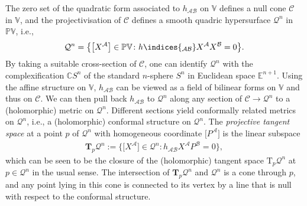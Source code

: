 \documentclass[10pt,a4paper]{amsart}
\numberwithin{equation}{section}
\newcommand{\mbf} [1]{\mathbf{#1}}
\newcommand{\mc} [1]{\mathcal{#1}}
\newcommand{\ind} {\indices}
\newcommand{\Tgt} {\mathrm{T}}
\newcommand{\Pp} {\mathbb{P}}
\newcommand{\E} {\mathbb{E}}
\newcommand{\C} {\mathbb{C}}
\newcommand{\V} {\mathbb{V}}
\begin{document}
The zero set of the quadratic form associated to $h_{\mc{A} \mc{B}}$ on $\V$ def\/ines a null cone $\mc{C}$ in $\V$, and the projectivisation of $\mc{C}$ def\/ines a smooth quadric hypersurface $\mc{Q}^n$ in $\Pp \V$, i.e.,
\begin{gather*}
\mc{Q}^n = \big\{ \big[X^\mc{A}\big] \in \Pp \V \colon h \ind{_{\mc{A} \mc{B}}} X^\mc{A} X^\mc{B} = 0 \big\} .
\end{gather*}
By taking a suitable cross-section of $\mc{C}$, one can identify $\mc{Q}^n$ with the complexif\/ication $\C S^n$ of the standard $n$-sphere $S^n$ in Euclidean space $\E^{n+1}$. Using the af\/f\/ine structure on $\V$, $h_{\mc{A} \mc{B}}$ can be viewed as a f\/ield of bilinear forms on $\V$ and thus on $\mc{C}$. We can then pull back $h_{\mc{A} \mc{B}}$ to $\mc{Q}^n$ along any section of $\mc{C} \rightarrow \mc{Q}^n$ to a (holomorphic) metric on $\mc{Q}^n$. Dif\/ferent sections yield conformally related metrics on $\mc{Q}^n$, i.e., a (holomorphic) conformal structure on $\mc{Q}^n$. The \emph{projective tangent space} at a point $p$ of $\mc{Q}^n$ with homogeneous coordinate $\big[P^\mc{A}\big]$ is the linear subspace
\begin{gather*}
\mbf{T}_p \mc{Q}^n := \big\{ \big[X^\mc{A}\big] \in \mc{Q}^n \colon h_{\mc{A} \mc{B}} X^\mc{A} P^\mc{B} = 0\big \} ,
\end{gather*}
which can be seen to be the closure of the (holomorphic) tangent space $\Tgt_p \mc{Q}^n$ at $p \in \mc{Q}^n$ in the usual sense. The intersection of $\mbf{T}_p \mc{Q}^n$ and $\mc{Q}^n$ is a cone through $p$, and any point lying in this cone is connected to its vertex by a line that is null with respect to the conformal structure.
\end{document}
